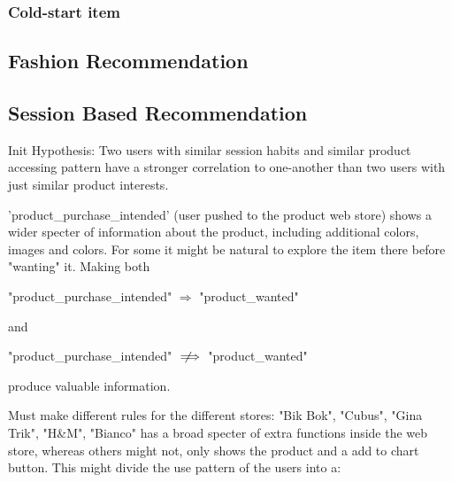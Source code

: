 \subsubsection{Cold-start item}






\subsection{Fashion Recommendation}



\subsection{Session Based Recommendation}
Init Hypothesis:
Two users with similar session habits and similar product accessing pattern
have a stronger correlation to one-another than two users with just similar
product interests.


'product\_purchase\_intended' (user pushed to the product web store) shows a
wider specter of information about the product, including additional colors,
images and colors.  For some it might be natural to explore the item there
before "wanting" it. Making both

"product\_purchase\_intended" $\Rightarrow$ "product\_wanted"

and

"product\_purchase\_intended" $\notimplies$ "product\_wanted"

produce valuable information.

Must make different rules for the different stores:
"Bik Bok", "Cubus", "Gina Trik", "H\&M", "Bianco" has a broad specter of extra
functions inside the web store, whereas others might not, only shows the
product and a add to chart button.  This might divide the use pattern of the
users into a:

